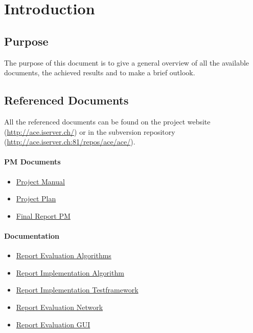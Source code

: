 \documentclass[11pt,a4paper]{article}
\begin{document}
\setlength{\parindent}{0pt}


\newpage

\tableofcontents
\newpage

\listoftables
\listoffigures
\newpage


\section{Introduction}
\subsection{Purpose}
The purpose of this document is to give a general overview of all the available documents, the achieved results and to make a brief outlook.

\subsection{Referenced Documents}
All the referenced documents can be found on the project website (\href{http://ace.iserver.ch/}{http://ace.iserver.ch/}) or in the subversion repository (\href{http://ace.iserver.ch:81/repos/ace/ace/}{http://ace.iserver.ch:81/repos/ace/ace/}).

\paragraph{PM Documents}
\begin{itemize}
 \item \href{http://ace.iserver.ch:81/repos/ace/ace/trunk/doc/pdf/projectmanual.pdf}{Project Manual}
 \item \href{http://ace.iserver.ch:81/repos/ace/ace/trunk/doc/pdf/projektplan.pdf}{Project Plan}
 \item \href{http://ace.iserver.ch:81/repos/ace/ace/trunk/doc/pdf/erfahrungsbericht.pdf}{Final Report PM}
\end{itemize}

\paragraph{Documentation}
\begin{itemize}
 \item \href{http://ace.iserver.ch:81/repos/ace/ace/trunk/doc/pdf/algorithm.pdf}{Report Evaluation Algorithms}
 \item \href{http://ace.iserver.ch:81/repos/ace/ace/trunk/doc/pdf/implementation-algorithm.pdf}{Report Implementation Algorithm}
 \item \href{http://ace.iserver.ch:81/repos/ace/ace/trunk/doc/pdf/testframework.pdf}{Report Implementation Testframework}
 \item \href{http://ace.iserver.ch:81/repos/ace/ace/trunk/doc/pdf/network.pdf}{Report Evaluation Network}
 \item \href{http://ace.iserver.ch:81/repos/ace/ace/trunk/doc/pdf/gui.pdf}{Report Evaluation GUI}
\end{itemize}
\end{document}
